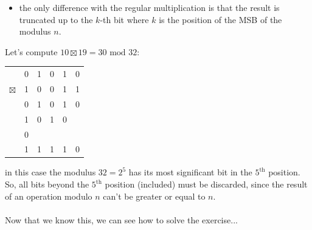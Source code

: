 \documentclass[11pt, a4paper]{article}
\newcommand{\mymod}{
    \text{ mod }
}
\begin{document}
\begin{itemize}
    \item the only difference with the regular multiplication is that the result is truncated up to the $k$-th bit where $k$ is the position of the MSB of the modulus $n$.
\end{itemize}
Let's compute $10\boxtimes19=30\mymod32$:
\begin{center}
    \begin{tabular}{cccccc}
        &0&1&0&1&0\\
        $\boxtimes$&1&0&0&1&1\\
        \hline
        &0&1&0&1&0\\
        &1&0&1&0&\\
        &0&&&&\\
        \hline
        &1&1&1&1&0
    \end{tabular}
\end{center}
in this case the modulus $32=2^5$ has its most significant bit in the $5^{\text{th}}$ position. So, all bits beyond the $5^{\text{th}}$ position (included) must be discarded, since the result of an operation modulo $n$ can't be greater or equal to $n$.\\\\
Now that we know this, we can see how to solve the exercise...

\newpage
\end{document}
